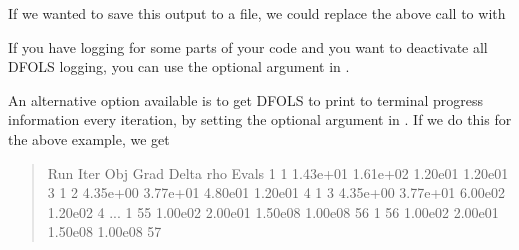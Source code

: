 \documentclass[letterpaper,10pt,english]{sphinxmanual}
\begin{document}
If we wanted to save this output to a file, we could replace the above call to  with
\begin{quote}

\begin{sphinxVerbatim}[commandchars=\\\{\}]
 
                     
\end{sphinxVerbatim}
\end{quote}

If you have logging for some parts of your code and you want to deactivate all DFO\sphinxhyphen{}LS logging, you can use the optional argument  in .

An alternative option available is to get DFO\sphinxhyphen{}LS to print to terminal progress information every iteration, by setting the optional argument  in . If we do this for the above example, we get
\begin{quote}

\begin{sphinxVerbatim}[commandchars=\\\{\}]
 Run  Iter     Obj       Grad     Delta      rho     Evals
  1     1    1.43e+01  1.61e+02  1.20e\PYGZhy{}01  1.20e\PYGZhy{}01    3
  1     2    4.35e+00  3.77e+01  4.80e\PYGZhy{}01  1.20e\PYGZhy{}01    4
  1     3    4.35e+00  3.77e+01  6.00e\PYGZhy{}02  1.20e\PYGZhy{}02    4
...
  1    55    1.00e\PYGZhy{}02  2.00e\PYGZhy{}01  1.50e\PYGZhy{}08  1.00e\PYGZhy{}08   56
  1    56    1.00e\PYGZhy{}02  2.00e\PYGZhy{}01  1.50e\PYGZhy{}08  1.00e\PYGZhy{}08   57
\end{sphinxVerbatim}
\end{quote}
\end{document}
